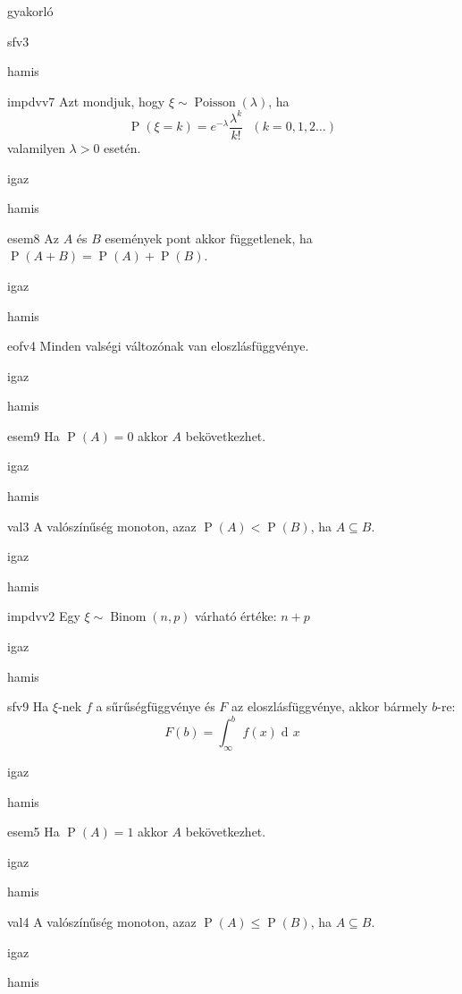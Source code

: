 \documentclass[12pt]{article}
\DeclareMathOperator{\Binom}{Binom}
\renewcommand{\P}{\operatorname{P}}
\renewcommand{\d}{\operatorname{d\! }} %
\DeclareMathOperator{\Poi}{{Poisson}}
\begin{document}
\begin{quiz}{gyakorló}
\begin{multi}{sfv3}
\item* hamis
\end{multi}
\begin{multi}{impdvv7}
Azt mondjuk, hogy $\xi\sim \Poi(\lambda)$, ha 
$$
\P(\xi=k)=e^{-\lambda}\frac{\lambda^k}{k!}\ \ \ (k=0,1,2\ldots )
$$ 
valamilyen $\lambda>0$ esetén.
\item* igaz
\item hamis
\end{multi}
\begin{multi}{esem8}
Az $A$ és $B$ események pont akkor függetlenek, ha $\P(A+B)=\P(A)+\P(B)$.
\item igaz
\item* hamis
\end{multi}
\begin{multi}{eofv4}
Minden valségi változónak van eloszlásfüggvénye.
\item* igaz
\item hamis
\end{multi}
\begin{multi}{esem9}
Ha $\P(A)=0$ akkor $A$ bekövetkezhet.
\item* igaz
\item hamis
\end{multi}
\begin{multi}{val3}
A valószínűség monoton, azaz $\P(A)<\P(B)$, ha $A\subseteq B$.
\item igaz
\item* hamis
\end{multi}
\begin{multi}{impdvv2}
Egy $\xi\sim \Binom(n,p)$ várható értéke: $n+p$
\item igaz
\item* hamis
\end{multi}
\begin{multi}{sfv9}
Ha $\xi$-nek $f$ a sűrűségfüggvénye és $F$ az eloszlásfüggvénye, akkor bármely $b$-re:
$$
F(b)=\int_{\infty}^{b}f(x)\d x
$$
\item* igaz
\item hamis
\end{multi}
\begin{multi}{esem5}
Ha $\P(A)=1$ akkor $A$ bekövetkezhet.
\item* igaz
\item hamis
\end{multi}
\begin{multi}{val4}
A valószínűség monoton, azaz $\P(A)\le \P(B)$, ha $A\subseteq B$.
\item* igaz
\item hamis
\end{multi}
\end{quiz}
\end{document}
